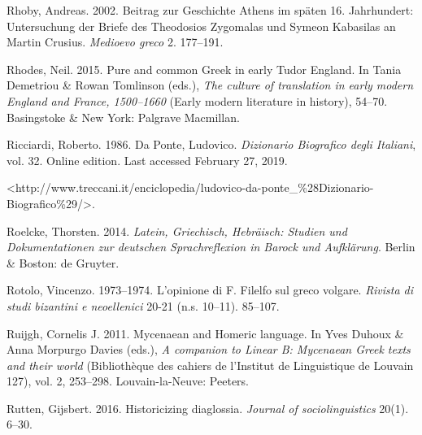 \begin{styleStandard}
Rhoby, Andreas. 2002. Beitrag zur Geschichte Athens im späten 16. Jahrhundert: Untersuchung der Briefe des Theodosios Zygomalas und Symeon Kabasilas an Martin Crusius. \textit{Medioevo greco} 2. 177–191.
\end{styleStandard}

\begin{styleStandard}
Rhodes, Neil. 2015. Pure and common Greek in early Tudor England. In Tania Demetriou \& Rowan Tomlinson (eds.), \textit{The culture of translation in early modern England and France, 1500–1660} (Early modern literature in history), 54–70. Basingstoke \& New York: Palgrave Macmillan.
\end{styleStandard}

\begin{styleStandard}
Ricciardi, Roberto. 1986. Da Ponte, Ludovico. \textit{Dizionario Biografico degli Italiani}, vol. 32. Online edition. Last accessed February 27, 2019.
\end{styleStandard}

\begin{styleStandard}
{\textless}http://www.treccani.it/enciclopedia/ludovico-da-ponte\_\%28Dizionario-Biografico\%29/{\textgreater}.
\end{styleStandard}

\begin{styleStandard}
Roelcke, Thorsten. 2014. \textit{Latein, Griechisch, Hebräisch: Studien und Dokumentationen zur deutschen Sprachreflexion in Barock und Aufklärung}. Berlin \& Boston: de Gruyter.
\end{styleStandard}

\begin{styleStandard}
Rotolo, Vincenzo. 1973–1974. L’opinione di F. Filelfo sul greco volgare. \textit{Rivista di studi bizantini e neoellenici} 20-21 (n.s. 10–11). 85–107.
\end{styleStandard}

\begin{styleStandard}
Ruijgh, Cornelis J. 2011. Mycenaean and Homeric language. In Yves Duhoux \& Anna Morpurgo Davies (eds.), \textit{A companion to Linear B: Mycenaean Greek texts and their world} (Bibliothèque des cahiers de l’Institut de Linguistique de Louvain 127), vol. 2, 253–298. Louvain-la-Neuve: Peeters.
\end{styleStandard}

\begin{styleStandard}
Rutten, Gijsbert. 2016. Historicizing diaglossia. \textit{Journal of sociolinguistics} 20(1). 6–30.
\end{styleStandard}

